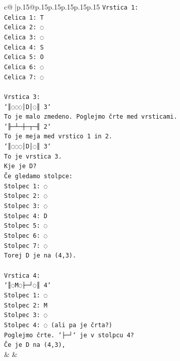 \documentclass{article}
\begin{document}
{\begin{supertabular}{c@{$\;$}|p{.15\linewidth}@{}p{.15\linewidth}p{.15\linewidth}p{.15\linewidth}p{.15\linewidth}p{.15\linewidth}}
{{{\texttt{Vrstica 1:} \\
\texttt{Celica 1: T} \\
\texttt{Celica 2: ◌} \\
\texttt{Celica 3: ◌} \\
\texttt{Celica 4: S} \\
\texttt{Celica 5: O} \\
\texttt{Celica 6: ◌} \\
\texttt{Celica 7: ◌} \\
\\ 
\texttt{Vrstica 3:} \\
\texttt{`║◌◌◌│D│◌║ 3`} \\
\texttt{To je malo zmedeno. Poglejmo črte med vrsticami.} \\
\texttt{`╟─┴─┼─┬─╢ 2`} \\
\texttt{To je meja med vrstico 1 in 2.} \\
\texttt{`║◌◌◌│D│◌║ 3`} \\
\texttt{To je vrstica 3.} \\
\texttt{Kje je D?} \\
\texttt{Če gledamo stolpce:} \\
\texttt{Stolpec 1: ◌} \\
\texttt{Stolpec 2: ◌} \\
\texttt{Stolpec 3: ◌} \\
\texttt{Stolpec 4: D} \\
\texttt{Stolpec 5: ◌} \\
\texttt{Stolpec 6: ◌} \\
\texttt{Stolpec 7: ◌} \\
\texttt{Torej D je na (4,3).} \\
\\ 
\texttt{Vrstica 4:} \\
\texttt{`║◌M◌├─┘◌║ 4`} \\
\texttt{Stolpec 1: ◌} \\
\texttt{Stolpec 2: M} \\
\texttt{Stolpec 3: ◌} \\
\texttt{Stolpec 4: ◌ (ali pa je črta?)} \\
\texttt{Poglejmo črte. `├─┘` je v stolpcu 4?} \\
\texttt{Če je D na (4,3),} \\
            }
        }
    }
    & & \\ \\


\end{supertabular}}
\end{document}
